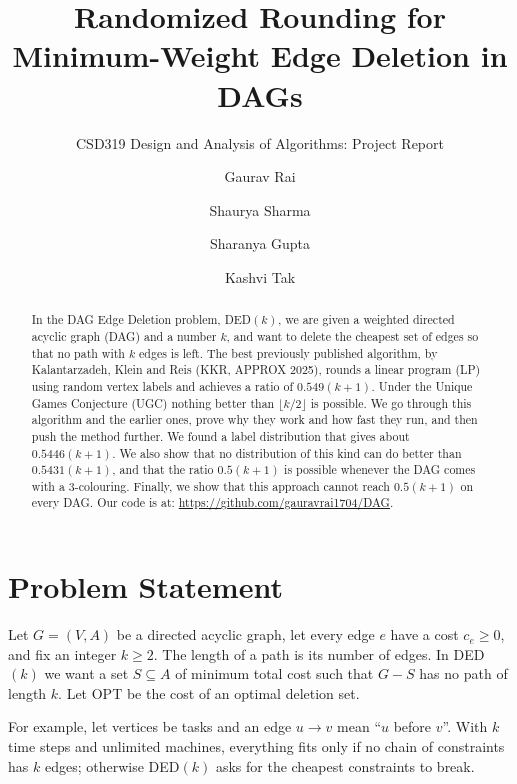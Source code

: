 \documentclass[sigconf,nonacm]{acmart}
\newcommand{\DED}{\textsc{DED}}
\begin{document}
\title{Randomized Rounding for Minimum-Weight Edge Deletion in DAGs}
\subtitle{CSD319 Design and Analysis of Algorithms: Project Report}

\author{Gaurav Rai}
\author{Shaurya Sharma}
\author{Sharanya Gupta}
\author{Kashvi Tak}

\begin{abstract}
 In the DAG Edge Deletion problem, \DED$(k)$, we are given a weighted directed acyclic graph (DAG) and a number $k$, and want to delete the cheapest set of edges so that no path with $k$ edges is left. The best previously published algorithm, by Kalantarzadeh, Klein and Reis (KKR, APPROX 2025), rounds a linear program (LP) using random vertex labels and achieves a ratio of $0.549(k+1)$. Under the Unique Games Conjecture (UGC) nothing better than $\lfloor k/2\rfloor$ is possible. We go through this algorithm and the earlier ones, prove why they work and how fast they run, and then push the method further. We found a label distribution that gives about $0.5446(k+1)$. We also show that no distribution of this kind can do better than $0.5431(k+1)$, and that the ratio $0.5(k+1)$ is possible whenever the DAG comes with a 3-colouring. Finally, we show that this approach cannot reach $0.5(k+1)$ on every DAG. Our code is at: \url{https://github.com/gauravrai1704/DAG}.
\end{abstract}

\maketitle

\section{Problem Statement}

Let $G=(V,A)$ be a directed acyclic graph, let every edge $e$ have a cost $c_e\ge0$, and fix an integer $k\ge2$. The length of a path is its number of edges. In \DED$(k)$ we want a set $S\subseteq A$ of minimum total cost such that $G-S$ has no path of length $k$. Let OPT be the cost of an optimal deletion set.

 For example, let vertices be tasks and an edge $u\to v$ mean ``$u$ before $v$''. With $k$ time steps and unlimited machines, everything fits only if no chain of constraints has $k$ edges; otherwise \DED$(k)$ asks for the cheapest constraints to break.
\end{document}
